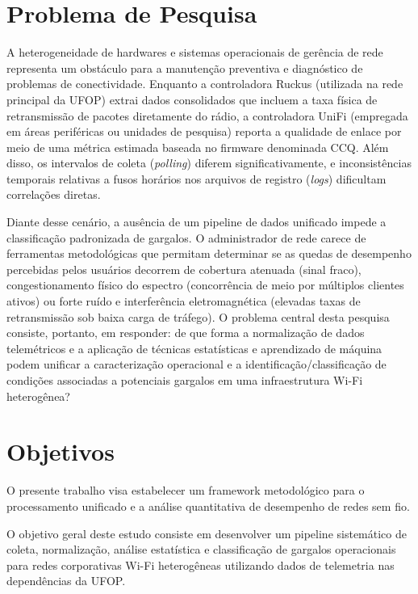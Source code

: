 \section{Problema de Pesquisa}
\label{sec:problema}

A heterogeneidade de hardwares e sistemas operacionais de gerência de rede representa um obstáculo para a manutenção preventiva e diagnóstico de problemas de conectividade. Enquanto a controladora Ruckus (utilizada na rede principal da \ac{UFOP}) extrai dados consolidados que incluem a taxa física de retransmissão de pacotes diretamente do rádio, a controladora UniFi (empregada em áreas periféricas ou unidades de pesquisa) reporta a qualidade de enlace por meio de uma métrica estimada baseada no firmware denominada \ac{CCQ}. Além disso, os intervalos de coleta (\textit{polling}) diferem significativamente, e inconsistências temporais relativas a fusos horários nos arquivos de registro (\textit{logs}) dificultam correlações diretas.

Diante desse cenário, a ausência de um pipeline de dados unificado impede a classificação padronizada de gargalos. O administrador de rede carece de ferramentas metodológicas que permitam determinar se as quedas de desempenho percebidas pelos usuários decorrem de cobertura atenuada (sinal fraco), congestionamento físico do espectro (concorrência de meio por múltiplos clientes ativos) ou forte ruído e interferência eletromagnética (elevadas taxas de retransmissão sob baixa carga de tráfego). O problema central desta pesquisa consiste, portanto, em responder: de que forma a normalização de dados telemétricos e a aplicação de técnicas estatísticas e aprendizado de máquina podem unificar a caracterização operacional e a identificação/classificação de condições associadas a potenciais gargalos em uma infraestrutura Wi-Fi heterogênea?

\section{Objetivos}
\label{sec:objetivos}

O presente trabalho visa estabelecer um framework metodológico para o processamento unificado e a análise quantitativa de desempenho de redes sem fio.

O objetivo geral deste estudo consiste em desenvolver um pipeline sistemático de coleta, normalização, análise estatística e classificação de gargalos operacionais para redes corporativas Wi-Fi heterogêneas utilizando dados de telemetria nas dependências da \ac{UFOP}.

